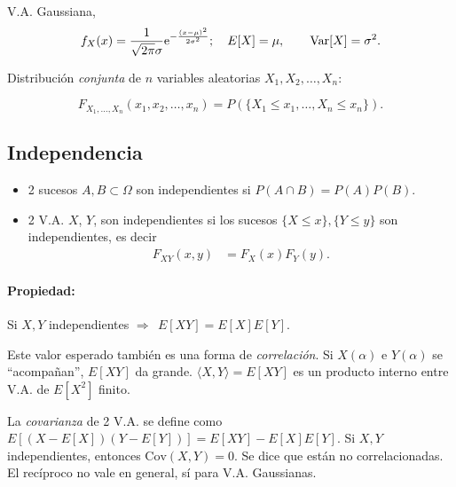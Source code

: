 \begin{ejemplo}
    V.A. Gaussiana,
    \[f_X(x)=\frac{1}{\sqrt{2\pi}\sigma}\mathrm{e}^{-\frac{(x-\mu)^2}{2\sigma^2}}; \quad  E[X]=\mu, \qquad
    \operatorname{Var}[X]=\sigma^2.\]
\end{ejemplo}

Distribución {\em conjunta} de $n$ variables aleatorias $X_1,
X_2,\ldots, X_n$:

\[F_{X_1,\ldots,X_n}(x_1,x_2,\ldots,x_n)=P\left(\{X_1\leq x_1,\ldots, X_n\leq x_n\}\right).\]

\subsection*{Independencia}

\begin{itemize}
    \item 2 sucesos $A,B\subset\Omega$ son independientes si $P(A\cap
    B)=P(A)P(B)$.
    \item 2 V.A. $X$, $Y$, son independientes si los sucesos $\{X\leq x\}, \{Y\leq y\}$
    son independientes, es decir
    \begin{align*}
                                            F_{XY}(x,y) & = F_X(x)
                                            F_Y(y).
                                        \end{align*}
\end{itemize}

\paragraph{Propiedad: } Si $X,Y$ independientes $\Rightarrow \ \ E[XY]=E[X]E[Y]$.

Este valor esperado también es una forma de \emph{correlación}. Si
$X(\alpha)$ e $Y(\alpha)$ se ``acompañan'', $E[XY]$ da grande.
$\langle X,Y\rangle=E[XY]$ es un producto interno entre V.A. de
$E[X^2]$ finito.

La \emph{covarianza} de 2 V.A. se define como
$E\left[\left(X-E[X]\right)\left(Y-E[Y]\right)\right]=E[XY]-E[X]E[Y]$.
Si $X,Y$ independientes, entonces $\mathrm{Cov}(X,Y)=0$. Se dice
que están no correlacionadas. El recíproco no vale en general, sí
para V.A. Gaussianas.
